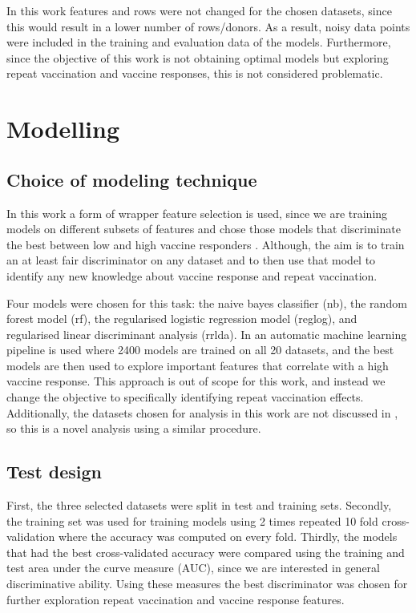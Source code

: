 In this work features and rows were not changed for the chosen datasets, since this would result in a lower number of rows/donors.
As a result, noisy data points were included in the training and evaluation data of the models.
Furthermore, since the objective of this work is not obtaining optimal models but exploring repeat vaccination and vaccine responses, this is not considered problematic.

\section{Modelling}

\subsection{Choice of modeling technique}

In this work a form of wrapper feature selection is used, since we are training models on different subsets of features and chose those models that discriminate the best between low and high vaccine responders \citep{hiraReviewFeatureSelection2015}.
Although, the aim is to train an at least fair discriminator on any dataset and to then use that model to identify any new knowledge about vaccine response and repeat vaccination.

Four models were chosen for this task: the naive bayes classifier (nb), the random forest model (rf), the regularised logistic regression model (reglog), and regularised linear discriminant analysis (rrlda).
In \spaper an automatic machine learning pipeline is used where 2400 models are trained on all 20 datasets, and the best models are then used to explore important features that correlate with a high vaccine response.
This approach is out of scope for this work, and instead we change the objective to specifically identifying repeat vaccination effects.
Additionally, the datasets chosen for analysis in this work are not discussed in \spaper, so this is a novel analysis using a similar procedure.

\subsection{Test design}

First, the three selected datasets were split in test and training sets.
Secondly, the training set was used for training models using 2 times repeated 10 fold cross-validation where the accuracy was computed on every fold.
Thirdly, the models that had the best cross-validated accuracy were compared using the training and test area under the curve measure (AUC), since we are interested in general discriminative ability.
Using these measures the best discriminator was chosen for further exploration repeat vaccination and vaccine response features.

